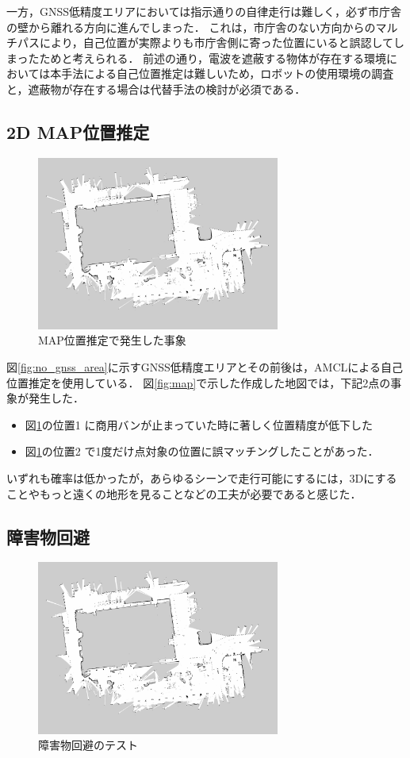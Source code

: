 \documentclass[platex,dvipdfmx]{rbproceedings}
\begin{document}
一方，GNSS低精度エリアにおいては指示通りの自律走行は難しく，必ず市庁舎の壁から離れる方向に進んでしまった．
これは，市庁舎のない方向からのマルチパスにより，自己位置が実際よりも市庁舎側に寄った位置にいると誤認してしまったためと考えられる．
前述の通り，電波を遮蔽する物体が存在する環境においては本手法による自己位置推定は難しいため，ロボットの使用環境の調査と，遮蔽物が存在する場合は代替手法の検討が必須である．

\subsection{2D MAP位置推定}
\begin{figure}[htbp]
    \centering   
    \includegraphics[keepaspectratio,width=80mm]{fig/map.png}
    \caption{MAP位置推定で発生した事象}
    \label{fig:map_lost}
\end{figure}

図\ref{fig:no_gnss_area}に示すGNSS低精度エリアとその前後は，AMCLによる自己位置推定を使用している．
図\ref{fig:map}で示した作成した地図では，下記2点の事象が発生した．
\begin{itemize}
    \item 図\ref{fig:map_lost}の位置1 に商用バンが止まっていた時に著しく位置精度が低下した
    \item 図\ref{fig:map_lost}の位置2 で1度だけ点対象の位置に誤マッチングしたことがあった．
\end{itemize}
いずれも確率は低かったが，あらゆるシーンで走行可能にするには，3Dにすることやもっと遠くの地形を見ることなどの工夫が必要であると感じた．

\subsection{障害物回避}
\begin{figure}[htbp]
    \centering   
    \includegraphics[keepaspectratio,width=80mm]{fig/map.png}
    \caption{障害物回避のテスト}
    \label{fig:avoidance_test}
\end{figure}
\end{document}
